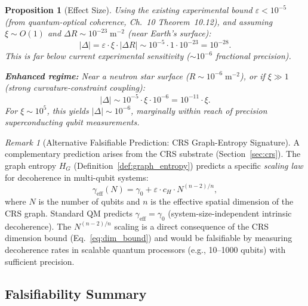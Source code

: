 \documentclass[11pt,a4paper]{article}
\newtheorem{proposition}[definition]{Proposition}
\theoremstyle{remark}
\newtheorem{remark}[definition]{Remark}
\begin{document}
\begin{proposition}[Effect Size]
\label{prop:effect_size}
Using the existing experimental bound $\varepsilon < 10^{-5}$ (from
quantum-optical coherence, Ch.~10 Theorem~10.12), and assuming
$\xi \sim O(1)$ and $\Delta R \sim 10^{-23}\;\mathrm{m}^{-2}$
(near Earth's surface):
\begin{equation}
  |\Delta| = \varepsilon \cdot \xi \cdot |\Delta R|
  \sim 10^{-5} \cdot 1 \cdot 10^{-23}
  = 10^{-28}.
\end{equation}
This is far below current experimental sensitivity
($\sim 10^{-6}$ fractional precision).

\textbf{Enhanced regime:} Near a neutron star surface
($R \sim 10^{-6}\;\mathrm{m}^{-2}$), or if $\xi \gg 1$ (strong
curvature-constraint coupling):
\begin{equation}
  |\Delta| \sim 10^{-5} \cdot \xi \cdot 10^{-6}
  = 10^{-11} \cdot \xi.
\end{equation}
For $\xi \sim 10^5$, this yields $|\Delta| \sim 10^{-6}$, marginally
within reach of precision superconducting qubit measurements.
\end{proposition}

\begin{remark}[Alternative Falsifiable Prediction: CRS Graph-Entropy Signature]
\label{rem:crs_predict}
A complementary prediction arises from the CRS substrate
(Section~\ref{sec:crs}).  The graph entropy
$H_G$ (Definition~\ref{def:graph_entropy}) predicts a specific
\emph{scaling law} for decoherence in multi-qubit systems:
\begin{equation}
\label{eq:crs_scaling}
  \gamma_{\mathrm{eff}}(N) =
    \gamma_0 + \varepsilon \cdot c_H \cdot N^{(n-2)/n},
\end{equation}
where $N$ is the number of qubits and $n$ is the effective spatial
dimension of the CRS graph.  Standard QM predicts
$\gamma_{\mathrm{eff}} = \gamma_0$ (system-size-independent intrinsic
decoherence).  The $N^{(n-2)/n}$ scaling is a direct consequence of
the CRS dimension bound (Eq.~\eqref{eq:dim_bound}) and would be
falsifiable by measuring decoherence rates in scalable quantum
processors (e.g., 10--1000 qubits) with sufficient precision.
\end{remark}

\subsection{Falsifiability Summary}
\end{document}
